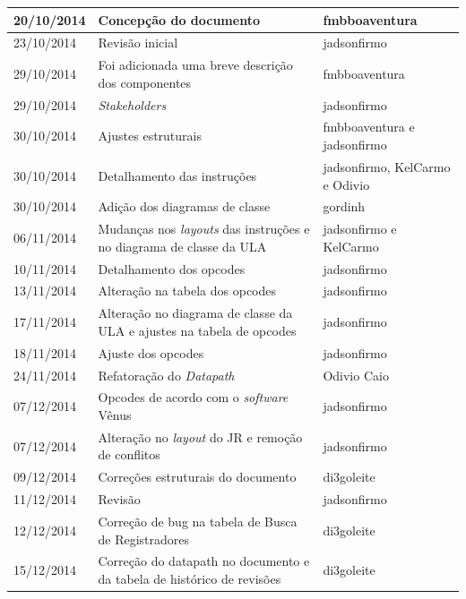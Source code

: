 \documentclass{report}
\begin{document}
\begin{center}
\begin{longtable}[pos]{|m{2cm} | m{8cm} | m{4cm}|}
		20/10/2014 & Concepção do documento & fmbboaventura \\ \hline
		23/10/2014 & Revisão inicial & jadsonfirmo \\ \hline
		29/10/2014 & Foi adicionada uma breve descrição dos componentes & fmbboaventura \\ \hline       
		29/10/2014 & \textit{Stakeholders} & jadsonfirmo \\ \hline
		30/10/2014 & Ajustes estruturais & fmbboaventura e jadsonfirmo \\ \hline
		30/10/2014 & Detalhamento das instruções & jadsonfirmo, KelCarmo e Odivio \\ \hline
		30/10/2014 & Adição dos diagramas de classe & gordinh \\ \hline
		06/11/2014 & Mudanças nos \textit{layouts} das instruções e no diagrama de classe da ULA & jadsonfirmo e KelCarmo \\ \hline
		10/11/2014 & Detalhamento dos opcodes & jadsonfirmo \\ \hline
		13/11/2014 & Alteração na tabela dos opcodes & jadsonfirmo \\ \hline
		17/11/2014 & Alteração no diagrama de classe da ULA e ajustes na tabela de opcodes & jadsonfirmo \\ \hline
		18/11/2014 & Ajuste dos opcodes & jadsonfirmo \\ \hline
		24/11/2014 & Refatoração do \textit{Datapath} & Odivio Caio \\ \hline
		07/12/2014 & Opcodes de acordo com o \textit{software} Vênus & jadsonfirmo \\ \hline
		07/12/2014 & Alteração no \textit{layout} do JR e remoção de conflitos & jadsonfirmo \\ \hline
		09/12/2014 & Correções estruturais do documento & di3goleite \\ \hline
		11/12/2014 & Revisão & jadsonfirmo \\ \hline
		12/12/2014 & Correção de bug na tabela de Busca de Registradores & di3goleite \\ \hline
		15/12/2014 & Correção do datapath no documento e da tabela de histórico de revisões & di3goleite \\ \hline
	\end{longtable}
\end{center}

\tableofcontents

\end{document}
